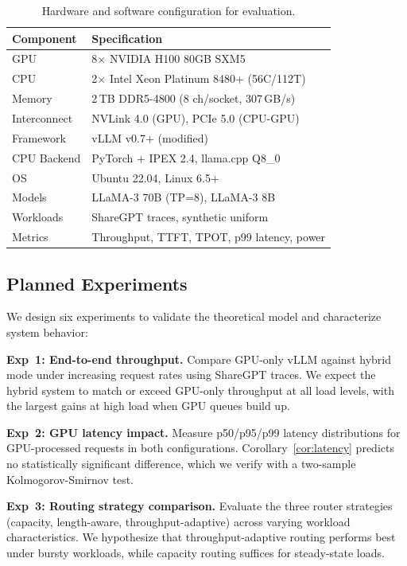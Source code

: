 \documentclass[10pt,conference]{IEEEtran}
\begin{document}
\begin{table}[t]
\centering
\caption{Hardware and software configuration for evaluation.}
\label{tab:setup}
\footnotesize
\begin{tabular}{@{}ll@{}}
\toprule
\textbf{Component} & \textbf{Specification} \\
\midrule
GPU & 8$\times$ NVIDIA H100 80GB SXM5 \\
CPU & 2$\times$ Intel Xeon Platinum 8480+ (56C/112T) \\
Memory & 2\,TB DDR5-4800 (8 ch/socket, 307\,GB/s) \\
Interconnect & NVLink 4.0 (GPU), PCIe 5.0 (CPU-GPU) \\
\midrule
Framework & vLLM v0.7+ (modified) \\
CPU Backend & PyTorch + IPEX 2.4, llama.cpp Q8\_0 \\
OS & Ubuntu 22.04, Linux 6.5+ \\
\midrule
Models & LLaMA-3 70B (TP=8), LLaMA-3 8B \\
Workloads & ShareGPT traces, synthetic uniform \\
Metrics & Throughput, TTFT, TPOT, p99 latency, power \\
\bottomrule
\end{tabular}
\end{table}

\subsection{Planned Experiments}

We design six experiments to validate the theoretical model and characterize system behavior:

\textbf{Exp~1: End-to-end throughput.}
Compare GPU-only vLLM against hybrid mode under increasing request rates using ShareGPT traces.
We expect the hybrid system to match or exceed GPU-only throughput at all load levels, with the largest gains at high load when GPU queues build up.

\textbf{Exp~2: GPU latency impact.}
Measure p50/p95/p99 latency distributions for GPU-processed requests in both configurations.
Corollary~\ref{cor:latency} predicts no statistically significant difference, which we verify with a two-sample Kolmogorov-Smirnov test.

\textbf{Exp~3: Routing strategy comparison.}
Evaluate the three router strategies (capacity, length-aware, throughput-adaptive) across varying workload characteristics.
We hypothesize that throughput-adaptive routing performs best under bursty workloads, while capacity routing suffices for steady-state loads.
\end{document}
